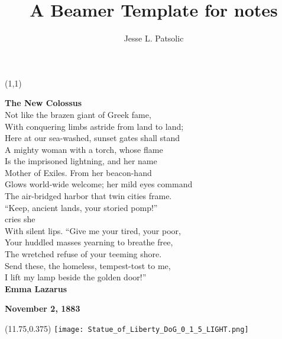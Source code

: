 \documentclass[xcolor=dvipsnames, aspectratio=169]{beamer}
\title[Daily Notes]{A Beamer Template for notes}
\subtitle[]{}
\author[JLP]{Jesse L. Patsolic}
\begin{document}
\begin{frame}[plain]
\begin{textblock}{5}(1,1)
    {\color{black}
\tiny
\textbf{The New Colossus}\\

Not like the brazen giant of Greek fame,\\
With conquering limbs astride from land to land;\\
Here at our sea-washed, sunset gates shall stand\\
A mighty woman with a torch, whose flame\\
Is the imprisoned lightning, and her name\\
Mother of Exiles. From her beacon-hand\\
Glows world-wide welcome; her mild eyes command\\
The air-bridged harbor that twin cities frame.\\
``Keep, ancient lands, your storied pomp!''\\ 
    cries she\\
With silent lips. ``Give me your tired, your poor,\\
Your huddled masses yearning to breathe free,\\
The wretched refuse of your teeming shore.\\
Send these, the homeless, tempest-tost to me,\\
I lift my lamp beside the golden door!''\\


\textbf{Emma Lazarus}

\textbf{November 2, 1883}
}
\end{textblock}

\begin{textblock}{5}(11.75,0.375)
\texttt{[image: Statue\_of\_Liberty\_DoG\_0\_1\_5\_LIGHT.png]}

\end{textblock}
\end{frame}
\end{document}

